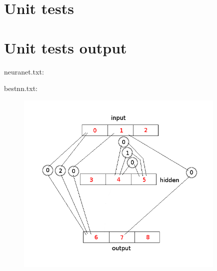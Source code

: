 \begin{scriptsize}
\begin{ttfamily}

\end{ttfamily}
\end{scriptsize}

\section{Unit tests}

\begin{scriptsize}
\begin{ttfamily}

\end{ttfamily}
\end{scriptsize}

\section{Unit tests output}

\begin{scriptsize}
\begin{ttfamily}

\end{ttfamily}
\end{scriptsize}

neuranet.txt:\\
\begin{scriptsize}
\begin{ttfamily}

\end{ttfamily}
\end{scriptsize}

bestnn.txt:\\
\begin{scriptsize}
\begin{ttfamily}

\end{ttfamily}
\end{scriptsize}

\begin{center}
\begin{figure}[H]
\centering\includegraphics[width=10cm]{./example.png}\\
\end{figure}
\end{center}

